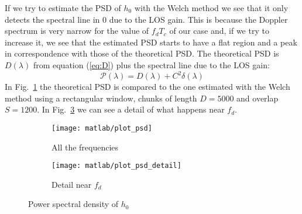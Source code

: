 \documentclass[a4paper,oneside]{article}
\begin{document}
If we try to estimate the PSD of $h_0$ with the Welch method we see
that it only detects the spectral line in 0 due to the LOS gain. This
is because the Doppler spectrum is very narrow for the value of
$f_dT_c$ of our case and, if we try to increase it, we see that the
estimated PSD starts to have a flat region and a peak in
correspondence with those of the theoretical PSD.  The theoretical PSD
is $D(\lambda)$ from equation (\ref{eq:D}) plus the spectral line due
to the LOS gain:
\begin{equation}
  \mathcal{P}(\lambda) = D(\lambda) + C^2\delta(\lambda)
\end{equation}
In Fig.~\ref{plot:psd} the theoretical PSD is compared to the one
estimated with the Welch method using a rectangular window, chunks of
length $D=5000$ and overlap $S=1200$. In Fig.~\ref{plot:psd_detail} we
can see a detail of what happens near $f_d$.
\begin{figure}[htbp]
  \centering
  \begin{subfigure}{0.7\textwidth}
    \centering
    \texttt{[image: matlab/plot\_psd]}
  \caption{All the frequencies}
  \label{plot:psd}
  \end{subfigure}
  \begin{subfigure}{0.7\textwidth}
    \centering
    \texttt{[image: matlab/plot\_psd\_detail]}
  \caption{Detail near $f_d$}
  \label{plot:psd_detail}
  \end{subfigure}
  \caption{Power spectral density of $h_0$}
\end{figure}
\end{document}
